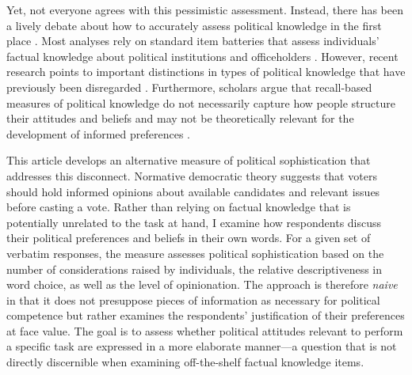 \documentclass[12pt]{article}
\begin{document}
Yet, not everyone agrees with this pessimistic assessment. Instead, there has been a lively debate about how to accurately assess political knowledge in the first place \citep[e.g.][]{mondak2000reconsidering,mondak2001asked,sturgis2008experiment,debell2013harder,pietryka2013analysis}. Most analyses rely on standard item batteries that assess individuals' factual knowledge about political institutions and officeholders \citep[e.g.,][]{carpini1996americans}. However, recent research points to important distinctions in types of political knowledge that have previously been disregarded \citep{barabas2014question}. Furthermore, scholars argue that recall-based measures of political knowledge do not necessarily capture how people structure their attitudes and beliefs \citep[e.g.,][]{luskin1987measuring} and may not be theoretically relevant for the development of informed preferences \citep[e.g.,][]{lupia2006elitism,gilens2001political}.


This article develops an alternative measure of political sophistication that addresses this disconnect. Normative democratic theory suggests that voters should hold informed opinions about available candidates and relevant issues before casting a vote. Rather than relying on factual knowledge that is potentially unrelated to the task at hand, I examine how respondents discuss their political preferences and beliefs in their own words. For a given set of verbatim responses, the measure assesses political sophistication based on the number of considerations raised by individuals, the relative descriptiveness in word choice, as well as the level of opinionation. The approach is therefore \textit{naive} in that it does not presuppose pieces of information as necessary for political competence but rather examines the respondents' justification of their preferences at face value. The goal is to assess whether political attitudes relevant to perform a specific task are expressed in a more elaborate manner---a question that is not directly discernible when examining off-the-shelf factual knowledge items. %
\end{document}
